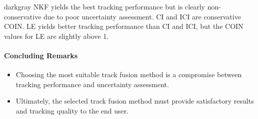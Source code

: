 \documentclass[a0paper,portrait,twocols]{def/LiUposter} %
\begin{document}
{\begin{minipage}{\columnwidth}
\begin{mybox}[title={Design Evaluation Results}]{darkgray}
NKF yields the best tracking performance but is clearly non-conservative due to poor uncertainty assessment. CI and ICI are conservative \wrt COIN. LE yields better tracking performance than CI and ICI, but the COIN values for LE are slightly above 1.

\paragraph{Concluding Remarks}
\begin{itemize}
	\item Choosing the most suitable track fusion method is a compromise between tracking performance and uncertainty assessment.
	\item Ultimately, the selected track fusion method must provide satisfactory results and tracking quality to the end user.
\end{itemize}

\end{mybox}



\end{minipage}} %



    

 	 
\end{document}
